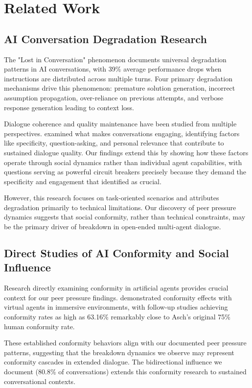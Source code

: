 \documentclass[11pt,letterpaper]{article}
\newcommand{\exponedataBidirectionalPercentage}{80.8\%}
\begin{document}
\section{Related Work}

\subsection{AI Conversation Degradation Research}

The "Lost in Conversation" phenomenon \citep{laban2025lost} documents universal degradation patterns in AI conversations, with 39\% average performance drops when instructions are distributed across multiple turns. Four primary degradation mechanisms drive this phenomenon: premature solution generation, incorrect assumption propagation, over-reliance on previous attempts, and verbose response generation leading to context loss.

Dialogue coherence and quality maintenance have been studied from multiple perspectives. \citet{see2019makes} examined what makes conversations engaging, identifying factors like specificity, question-asking, and personal relevance that contribute to sustained dialogue quality. Our findings extend this by showing how these factors operate through social dynamics rather than individual agent capabilities, with questions serving as powerful circuit breakers precisely because they demand the specificity and engagement that \citet{see2019makes} identified as crucial.

However, this research focuses on task-oriented scenarios and attributes degradation primarily to technical limitations. Our discovery of peer pressure dynamics suggests that social conformity, rather than technical constraints, may be the primary driver of breakdown in open-ended multi-agent dialogue.

\subsection{Direct Studies of AI Conformity and Social Influence}

Research directly examining conformity in artificial agents provides crucial context for our peer pressure findings. \citet{kyrlitsias2018conformity} demonstrated conformity effects with virtual agents in immersive environments, with follow-up studies achieving conformity rates as high as 63.16\% remarkably close to Asch's original 75\% human conformity rate.

These established conformity behaviors align with our documented peer pressure patterns, suggesting that the breakdown dynamics we observe may represent conformity cascades in extended dialogue. The bidirectional influence we document (\exponedataBidirectionalPercentage{} of conversations) extends this conformity research to sustained conversational contexts.
\end{document}
